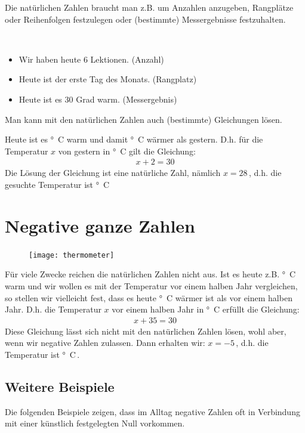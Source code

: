\vspace{.5cm}
Die natürlichen Zahlen braucht man z.B. um Anzahlen anzugeben, Rangplätze oder Reihenfolgen festzulegen oder (bestimmte) Messergebnisse festzuhalten.

\begin{example}~
	\begin{itemize}\setlength\itemsep{0pt}
		\item Wir haben heute 6 Lektionen. (Anzahl)
		\item Heute ist der erste Tag des Monats. (Rangplatz)
		\item Heute ist es 30 Grad warm. (Messergebnis)
	\end{itemize}
\end{example}

Man kann mit den natürlichen Zahlen auch (bestimmte) Gleichungen lösen.
\begin{example}
 Heute ist es \unit[30]{°C} warm und damit \unit[2]{°C} wärmer als gestern.
 D.h. für die Temperatur $x$ von gestern in \unit{°C} gilt die Gleichung:
 \begin{align*}
   x + 2 = 30
 \end{align*}
Die Lösung der Gleichung ist eine natürliche Zahl, nämlich $x = 28$\,, d.h. die gesuchte Temperatur ist \unit[28]{°C}
\end{example}


\section{Negative ganze Zahlen}
\begin{figure}
 \texttt{[image: thermometer]}
\end{figure}
Für viele Zwecke reichen die natürlichen Zahlen nicht aus.
Ist es heute z.B. \unit[30]{°C} warm und wir wollen es mit der Temperatur vor einem halben Jahr vergleichen, so stellen wir vielleicht fest, dass es heute \unit[35]{°C} wärmer ist als vor einem halben Jahr.
D.h. die Temperatur $x$ vor einem halben Jahr in \unit{°C} erfüllt die Gleichung:
\begin{align*}
	x + 35 = 30
\end{align*}
Diese Gleichung lässt sich nicht mit den natürlichen Zahlen lösen, wohl aber, wenn wir negative Zahlen zulassen.
Dann erhalten wir: $x = -5$\,, d.h. die Temperatur ist \unit[--5]{°C}\,.

\subsection{Weitere Beispiele}
Die folgenden Beispiele zeigen, dass im Alltag negative Zahlen oft in Verbindung mit einer künstlich festgelegten Null vorkommen.

